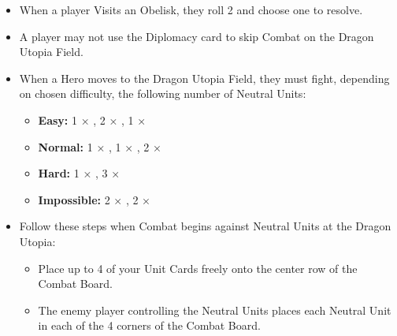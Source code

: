 \begin{multicols*}{2}
\begin{itemize}
  \item When a player Visits an Obelisk, they roll 2  and choose one to resolve.
  \item A player may not use the Diplomacy card to skip Combat on the Dragon Utopia Field.
  \item When a Hero moves to the Dragon Utopia Field, they must fight, depending on chosen difficulty, the following number of Neutral Units:
  \begin{itemize}
    \item \textbf{Easy:} 1 × , 2 × , 1 × 
    \item \textbf{Normal:} 1 × , 1 × , 2 × 
    \item \textbf{Hard:} 1 × , 3 × 
    \item \textbf{Impossible:}  2 × , 2 × 
  \end{itemize}
  \item Follow these steps when Combat begins against Neutral Units at the Dragon Utopia:
  \begin{itemize}
    \item Place up to 4 of your Unit Cards freely onto the center row of the Combat Board.
    \item The enemy player controlling the Neutral Units places each Neutral Unit in each of the 4 corners of the Combat Board.
  \end{itemize}
\end{itemize}


\end{multicols*}
